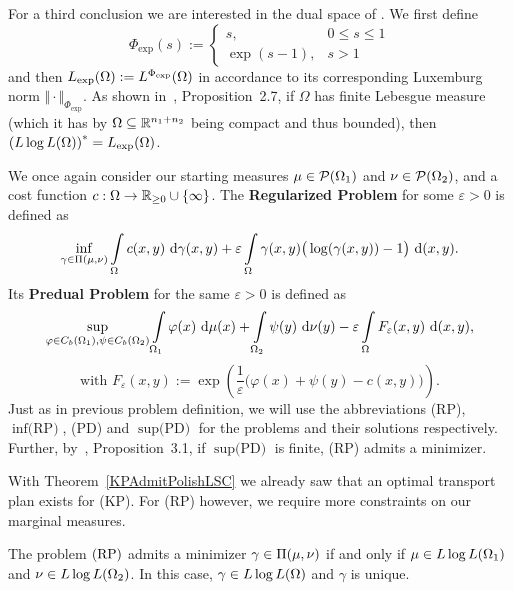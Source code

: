 For a third conclusion we are interested in the dual space of \LLL{}. We first define
\[ \Phi_{\exp}(s) := \begin{cases}
	s, & 0 \le s \le 1 \\
	\exp(s - 1), & s > 1
\end{cases} \]
and then $\Lexp := \Orlicz{\Phi_{\exp}}$ in accordance to its corresponding Luxemburg norm $\Vert \cdot \Vert_{\Phi_{\exp}}$. As shown in~\cite{Cla2021}, Proposition~2.7, if $\Omega$ has finite Lebesgue measure (which it has by $\Omega \subseteq \R^{n_1 + n_2}$ being compact and thus bounded), then ${(\LLL)}^* = \Lexp$.

\begin{definition}\label{RegProbs}
	We once again consider our starting measures $\mu \in \PM{\Omega_1}$ and $\nu \in \PM{\Omega_2}$, and a cost function $\map[c]{\Omega}{\RZero \cup \{ \infty \}}$. The \textbf{Regularized Problem} for some $\varepsilon > 0$ is defined as
	\[ \inf\limits_{\gamma \in \TP{\mu}{\nu}} \int\limits_\Omega c(x, y)~\Dx[x, y]{\gamma} + \varepsilon \int\limits_\Omega \gamma(x, y) \big( \log(\gamma(x, y)) - 1 \big)~\Dx[x, y]{}. \]
	Its \textbf{Predual Problem} for the same $\varepsilon > 0$ is defined as
	\[ \sup\limits_{\varphi \in \CF[b]{\Omega_1}, \psi \in \CF[b]{\Omega_2}} \int\limits_{\Omega_1} \varphi(x)~\Dx{\mu} + \int\limits_{\Omega_2} \psi(y)~\Dx[y]{\nu} - \varepsilon \int\limits_\Omega F_{\varepsilon}(x, y)~\Dx[x, y]{}, \]
	\[ \text{with } F_{\varepsilon}(x, y) := \exp\left( \frac{1}{\varepsilon} \big( \varphi(x) + \psi(y) - c(x, y) \big) \right). \]
	Just as in previous problem definition, we will use the abbreviations (RP), $\inf \text{(RP)}$, (PD) and $\sup \text{(PD)}$ for the problems and their solutions respectively. Further, by~\cite{Cla2021}, Proposition~3.1, if $\sup \text{(PD)}$ is finite, (RP) admits a minimizer.
\end{definition}

With Theorem~\ref{KPAdmitPolishLSC} we already saw that an optimal transport plan exists for (KP). For (RP) however, we require more constraints on our marginal measures.

\begin{theorem}\label{RegProbAdmitLLL}
	The problem$\text{\normalfont\ (RP)}$ admits a minimizer $\gamma \in \TP{\mu}{\nu}$ if and only if $\mu \in \LLL[\Omega_1]$ and $\nu \in \LLL[\Omega_2]$. In this case, $\gamma \in \LLL$ and $\gamma$ is unique.
\end{theorem}

